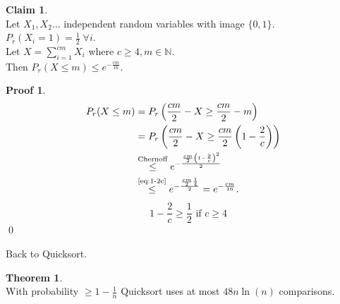 \documentclass[a4paper, 12pt]{book}
\theoremstyle{definition}
\newtheorem{claim}[counter]{Claim}
\newtheorem{theorem}[counter]{Theorem}
\newtheorem{pro}[counter]{Proof}
\theoremstyle{remark}
\begin{document}
\begin{claim} \text{} \\
  Let $X_1, X_2 \dots$ independent random variables with image $\{0,1\}$. \\
  $P_r(X_i = 1) = \frac{1}{2} \; \forall i$. \\
  Let $X = \sum_{i=1}^{cm} X_i$ where $c \geq 4, m \in \mathbb{N}$. \\
  Then $P_r(X \leq m) \leq e^{-\frac{cm}{16}}$.
\end{claim}
\begin{pro}
  \begin{align*}
    P_r(X \leq m) &= P_r\left(\frac{cm}{2} - X \geq \frac{cm}{2} - m\right) \\
    &= P_r\left(\frac{cm}{2} - X \geq \frac{cm}{2} \left(1 - \frac{2}{c}\right)\right) \\
    &\stackrel{\text{Chernoff}}{\leq} e^{-\frac{\frac{cm}{2} \left(1-\frac{2}{c}\right)^2}{2}} \\
    &\stackrel{\refeq{eq:1-2c}}{\leq} e^{-\frac{\frac{cm}{2} \frac{1}{4}}{2}} = e^{-\frac{cm}{16}}.
  \end{align*}
  \begin{equation}
    \label{eq:1-2c}
    \quad 1-\frac{2}{c} \geq \frac{1}{2} \text{ if } c \geq 4
  \end{equation}
  \qed
\end{pro}
Back to Quicksort.
\begin{theorem} \text{} \\
  With probability $\geq 1 - \frac{1}{n}$ Quicksort uses at most $48n\ln(n)$ comparisons.
\end{theorem}
\end{document}
